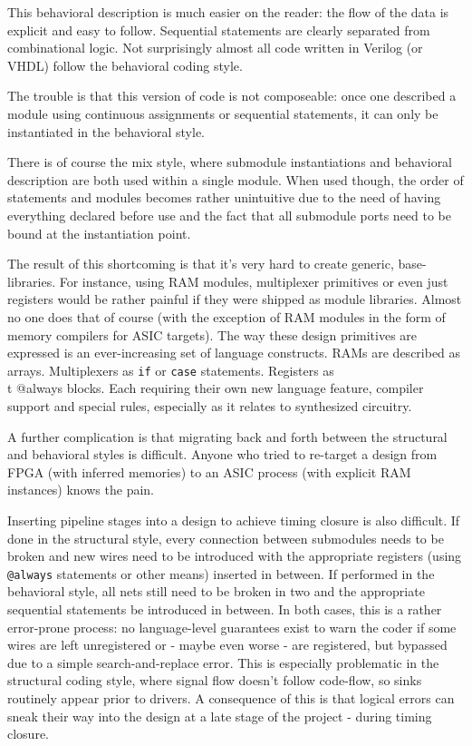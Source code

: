 \documentclass[conference,compsoc]{IEEEtran}
\begin{document}
This behavioral description is much easier on the reader: the flow of the data is explicit and
easy to follow. Sequential statements are clearly separated from combinational logic. Not
surprisingly almost all code written in Verilog (or VHDL) follow the behavioral coding style.

The trouble is that this version of code is not composeable: once one described a module using
continuous assignments or sequential statements, it can only be instantiated in the behavioral style.

There is of course the mix style, where submodule instantiations and behavioral description are
both used within a single module. When used though, the order of statements and modules becomes
rather unintuitive due to the need of having everything declared before use and the fact that all
submodule ports need to be bound at the instantiation point.

The result of this shortcoming is that it's very hard to create generic, base-libraries. For
instance, using RAM modules, multiplexer primitives or even just registers
would be rather painful if they were shipped as module libraries. Almost no one does that of course
(with the exception of RAM modules in the form of memory compilers for ASIC targets). The way these
design primitives are expressed is an ever-increasing set of language constructs. RAMs are described
as arrays. Multiplexers as {\tt if} or {\tt case} statements. Registers as {\\t @always} blocks.
Each requiring their own new language feature, compiler support and special rules, especially as
it relates to synthesized circuitry.

A further complication is that migrating back and forth between the structural and behavioral styles
is difficult. Anyone who tried to re-target a design from FPGA (with inferred memories) to an ASIC
process (with explicit RAM instances) knows the pain.

Inserting pipeline stages into a design to achieve timing closure is also difficult. If done in the
structural style, every connection between submodules needs to be broken and new wires need to be
introduced with the appropriate registers (using {\tt @always} statements or other means) inserted
in between. If performed in the behavioral style, all nets still need to be broken in two and the
appropriate sequential statements be introduced in between. In both cases, this is a rather
error-prone process: no language-level guarantees exist to warn the coder if some wires are left
unregistered or - maybe even worse - are registered, but bypassed due to a simple search-and-replace
error. This is especially problematic in the structural coding style, where signal flow doesn't
follow code-flow, so sinks routinely appear prior to drivers. A consequence of this is that logical
errors can sneak their way into the design at a late stage of the project - during timing closure.
\end{document}
